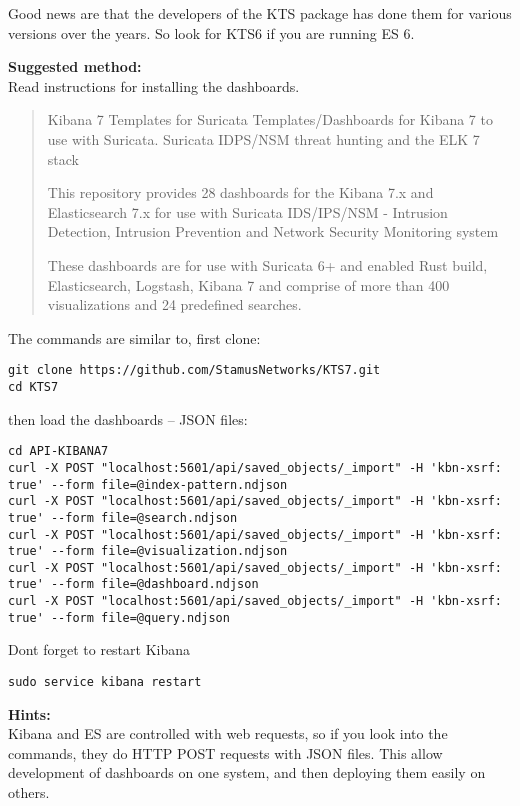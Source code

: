 \documentclass[a4paper,11pt,notitlepage]{report}
\begin{document}
Good news are that the developers of the KTS package has done them for various versions over the years. So look for KTS6 if you are running ES 6.

{\bf Suggested method:}\\
Read instructions for installing the dashboards.


\begin{quote}
Kibana 7 Templates for Suricata
Templates/Dashboards for Kibana 7 to use with Suricata. Suricata IDPS/NSM threat hunting and the ELK 7 stack

This repository provides 28 dashboards for the Kibana 7.x and Elasticsearch 7.x for use with Suricata IDS/IPS/NSM - Intrusion Detection, Intrusion Prevention and Network Security Monitoring system

These dashboards are for use with Suricata 6+ and enabled Rust build, Elasticsearch, Logstash, Kibana 7 and comprise of more than 400 visualizations and 24 predefined searches.
\end{quote}

The commands are similar to, first clone:
\begin{verbatim}
git clone https://github.com/StamusNetworks/KTS7.git
cd KTS7
\end{verbatim}

then load the dashboards -- JSON files:
\begin{verbatim}
cd API-KIBANA7
curl -X POST "localhost:5601/api/saved_objects/_import" -H 'kbn-xsrf: true' --form file=@index-pattern.ndjson
curl -X POST "localhost:5601/api/saved_objects/_import" -H 'kbn-xsrf: true' --form file=@search.ndjson
curl -X POST "localhost:5601/api/saved_objects/_import" -H 'kbn-xsrf: true' --form file=@visualization.ndjson
curl -X POST "localhost:5601/api/saved_objects/_import" -H 'kbn-xsrf: true' --form file=@dashboard.ndjson
curl -X POST "localhost:5601/api/saved_objects/_import" -H 'kbn-xsrf: true' --form file=@query.ndjson
\end{verbatim}

Dont forget to restart Kibana
\begin{verbatim}
sudo service kibana restart
\end{verbatim}


{\bf Hints:}\\
Kibana and ES are controlled with web requests, so if you look into the commands, they do HTTP POST requests with JSON files. This allow development of dashboards on one system, and then deploying them easily on others.
\end{document}
